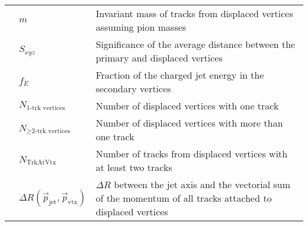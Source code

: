 \begin{table}[!htb]
\begin{scriptsize}
\begin{center}
\begin{tabularx}{\textwidth}{|X|l|X|}
    \cline{2-3}
            & $m$ & Invariant mass of tracks from displaced vertices assuming pion masses \\
    \cline{2-3}
            & $S_{xyz}$ & Significance of the average distance between the primary and displaced vertices \\
    \cline{2-3}
            & $f_E$ & Fraction of the charged jet energy in the secondary vertices \\
    \cline{2-3}
            & $N_{\text{1-trk vertices}}$ & Number of displaced vertices with one track \\
    \cline{2-3}
            & $N_{\ge\text{2-trk vertices}}$ & Number of displaced vertices with more than one track \\
    \cline{2-3}
            & $N_{\text{TrkAtVtx}}$ & Number of tracks from displaced vertices with at least two tracks \\
    \cline{2-3}
            & $\Delta R(\vec{p}_{\text{jet}}, \vec{p}_{\text{vtx}})$ & $\Delta R$ between the jet axis and the vectorial sum of the momentum of all tracks attached to displaced vertices \\
    \hline
    \hline
    \end{tabularx}
    \end{center}
    \end{scriptsize}
\end{table}
